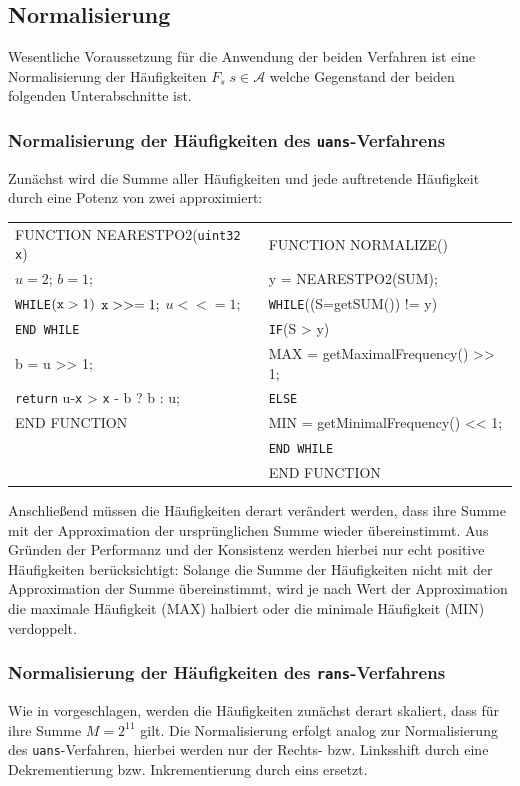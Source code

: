 \documentclass[a4paper,12pt]{article}
\newcommand{\A}{\mathcal A}
\begin{document}
\subsection{Normalisierung}
Wesentliche Voraussetzung für die Anwendung der beiden Verfahren ist eine Normalisierung der Häufigkeiten $F_{s}\;s\in\A$ welche Gegenstand der beiden folgenden Unterabschnitte ist.

\subsubsection{Normalisierung der Häufigkeiten des {\tt{uans}}-Verfahrens}

Zunächst wird die Summe aller Häufigkeiten und jede auftretende Häufigkeit durch eine Potenz von zwei approximiert:
\par

\begin{center}
\begin{tabular}{l | l}
FUNCTION NEARESTPO2({\tt{uint32 x}}) & FUNCTION NORMALIZE() 
\\
$u=2$; $b=1$;  & y = NEARESTPO2(SUM); 
\\
{\tt{WHILE}}$({\tt{x}} > 1)$ ${\tt{x}} >>= 1;$ $u <<= 1;$ & {\tt{WHILE}}((S=getSUM()) != y) 
\\
{\tt{END {\tt{WHILE}}}} & {\tt{IF}}(S > y)
\\
b = u >> 1;   & MAX = getMaximalFrequency() >> 1;
\\
{\tt{return}} u-{\tt{x}} > {\tt{x}} - b ? b : u; & {\tt{ELSE}}
\\
END FUNCTION & MIN = getMinimalFrequency() << 1;
\\
& {\tt{END WHILE}}
\\
& END FUNCTION
\end{tabular} 
\end{center}

Anschließend müssen die Häufigkeiten derart verändert werden, dass ihre Summe mit der Approximation der ursprünglichen Summe wieder übereinstimmt. Aus Gründen der Performanz und der Konsistenz werden hierbei nur echt positive Häufigkeiten berücksichtigt: Solange die Summe der Häufigkeiten nicht mit der Approximation der Summe übereinstimmt, wird je nach Wert der Approximation die maximale Häufigkeit (MAX) halbiert oder die minimale Häufigkeit (MIN) verdoppelt.   
 
\subsubsection{Normalisierung der Häufigkeiten des {\tt{rans}}-Verfahrens}
Wie in \cite{Krajcevski} vorgeschlagen, werden die Häufigkeiten zunächst derart skaliert, dass für ihre Summe $M= 2^{11}$ gilt. 
Die Normalisierung erfolgt analog zur Normalisierung des {\tt{uans}}-Verfahren, hierbei werden nur der Rechts- bzw. Linksshift durch eine Dekrementierung bzw. Inkrementierung durch eins ersetzt.
\end{document}
